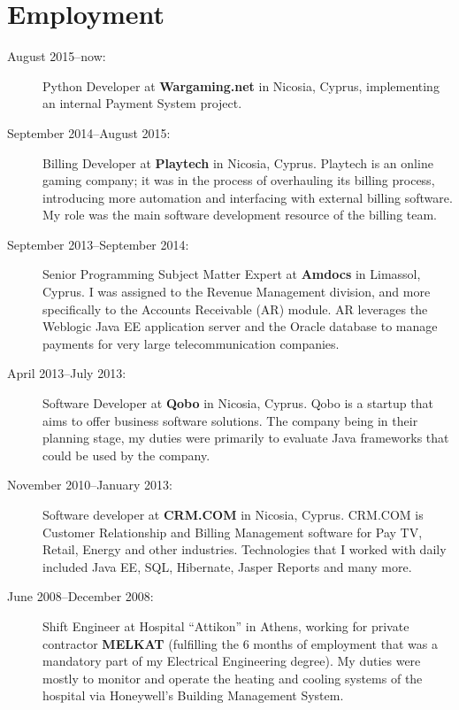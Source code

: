 \documentclass [a4paper,11pt]{article}
\newcommand{\landmark}[1]{{{#1}}}
\newcommand{\company}[1]{{\textbf{#1}}}
\begin{document}
	\section* {Employment}
		\begin {description}

			\item [August 2015--now:] \landmark{Python Developer} at
			\company{Wargaming.net} in Ni\-co\-si\-a, Cyprus, implementing an
			internal Payment System project.

			\item [September 2014--August 2015:] \landmark{Billing Developer} at
			\company{Playtech} in Ni\-co\-si\-a, Cyprus.  Playtech is an online
			gaming company; it was in the process of overhauling its billing
			process, introducing more automation and interfacing with external
			billing software. My role was the main software development
			resource of the billing team.

			\item [September 2013--September 2014:] \landmark{Senior
			Programming Subject Matter Expert} at \company{Amdocs} in
			Li\-ma\-ssol, Cyprus.  I was assigned to the Revenue Management
			division, and more specifically to the Accounts Receivable (AR)
			module. AR leverages the Weblogic Java EE application server and
			the Oracle database to manage payments for very large
			telecommunication companies.

			\item [April 2013--July 2013:] \landmark{Software Developer} at
			\company{Qobo} in Ni\-co\-si\-a, Cyprus.  Qobo is a startup that
			aims to offer business software solutions.  The company being in
			their planning stage, my duties were primarily to evaluate Java
			frameworks that could be used by the company.

			\item [November 2010--January 2013:] \landmark{Software developer}
			at \company{CRM.COM} in Ni\-co\-si\-a, Cyprus. CRM.COM is Customer
			Relationship and Billing Management software for Pay TV, Retail,
			Energy and other industries. Technologies that I worked with daily
			included Java EE, SQL, Hibernate, Jasper Reports and many more. 

			\item [June 2008--December 2008:] \landmark{Shift Engineer} at Hospital
			``Attikon'' in Athens, working for private contractor \company{MELKAT}
			(fulfilling the 6 months of employment that was a mandatory part of
			my Electrical Engineering degree).  My duties were mostly to monitor
			and operate the heating and cooling systems of the hospital via Honeywell's
			Building Management System.

		\end {description}
\end{document}
